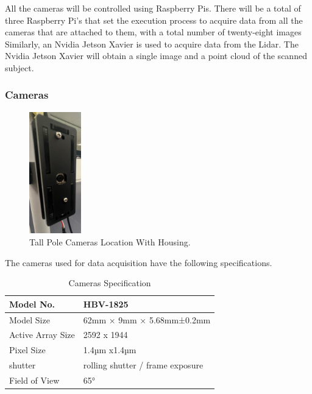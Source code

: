 \documentclass[12pt]{report}
\begin{document}
All the cameras will be controlled using Raspberry Pis.
There will be a total of three Raspberry Pi's that set the execution process to acquire data from all the cameras that are attached to them, with a total number of twenty-eight images
Similarly, an Nvidia Jetson Xavier is used to acquire data from the Lidar. The Nvidia Jetson Xavier will obtain a single image and a point cloud of the scanned subject. 

\newpage
\subsubsection*{Cameras}

 
\begin{figure}
  \begin{center}
    \includegraphics[width=0.2\textwidth]{IMG_5885_cropped.jpg}
  \end{center}
  \vspace{-10pt}
  \caption{Tall Pole Cameras Location With Housing.}
  \label{fig:Cameras}
\end{figure}

The cameras used for data acquisition have the following specifications. 
\begin{table}[H]
  \begin{tabular}{|l|l|}
  \hline
  Model No.         & HBV-1825                         \\ \hline
  Model Size        & 62mm × 9mm × 5.68mm±0.2mm        \\ \hline
  Active Array Size & 2592 x 1944                      \\ \hline
  Pixel Size        & 1.4µm x1.4µm                     \\ \hline
  shutter           & rolling shutter / frame exposure \\ \hline
  Field of View     & 65°                              \\ \hline
  \end{tabular}
  \captionsetup{singlelinecheck = false, format= hang, justification=raggedright, font=footnotesize, labelsep=space}
  \caption{Cameras Specification}
  \label{tab:Cameras_specs}
\end{table}
\end{document}
